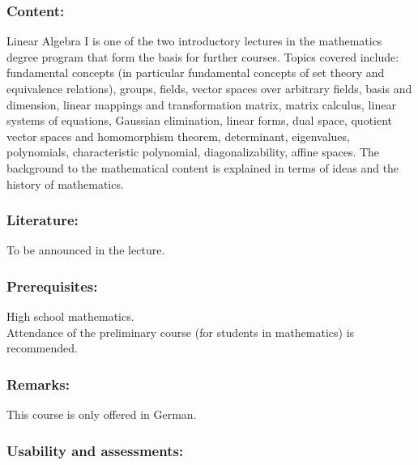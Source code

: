 \documentclass[a4paper,10pt]{article}
\begin{document}
\subsubsection*{\large
    Content:
}
Linear Algebra I is one of the two introductory lectures in the mathematics degree program that form the basis for further courses. Topics covered include: fundamental concepts (in particular fundamental concepts of set theory and equivalence relations), groups, fields, vector spaces over arbitrary fields, basis and dimension, linear mappings and transformation matrix, matrix calculus, linear systems of equations, Gaussian elimination, linear forms, dual space, quotient vector spaces and homomorphism theorem, determinant, eigenvalues, polynomials, characteristic polynomial, diagonalizability, affine spaces. The background to the mathematical content is explained in terms of ideas and the history of mathematics.
\subsubsection*{\large
    Literature:
}
To be announced in the lecture.
\subsubsection*{\large
    Prerequisites:
}
High school mathematics. \\ Attendance of the preliminary course (for students in mathematics) is recommended.
\subsubsection*{\large
    Remarks:
}
This course is only offered in German.
\subsubsection*{\large
    Usability and assessments:
}
\end{document}
